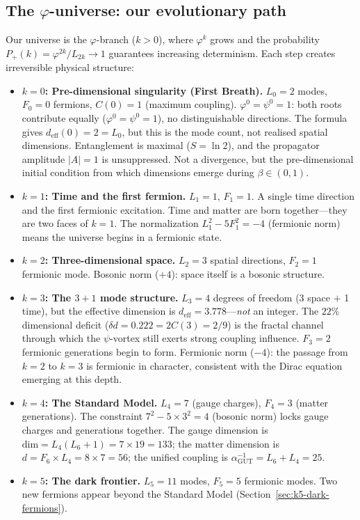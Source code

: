 \documentclass[12pt,a4paper]{article}
\begin{document}
\subsection{The $\varphi$-universe: our evolutionary path}

Our universe is the $\varphi$-branch ($k > 0$), where $\varphi^k$ grows and the probability $P_+(k) = \varphi^{2k}/L_{2k} \to 1$ guarantees increasing determinism. Each step creates irreversible physical structure:

\begin{itemize}
\item \textbf{$k = 0$: Pre-dimensional singularity (First Breath).} $L_0 = 2$ modes, $F_0 = 0$ fermions, $C(0) = 1$ (maximum coupling). $\varphi^0 = \psi^0 = 1$: both roots contribute equally ($\varphi^0 = \psi^0 = 1$), no distinguishable directions. The formula gives $d_{\mathrm{eff}}(0) = 2 = L_0$, but this is the mode count, not realised spatial dimensions. Entanglement is maximal ($S = \ln 2$), and the propagator amplitude $|A| = 1$ is unsuppressed.  Not a divergence, but the pre-dimensional initial condition from which dimensions emerge during $\beta \in (0,1)$.

\item \textbf{$k = 1$: Time and the first fermion.} $L_1 = 1$, $F_1 = 1$. A single time direction and the first fermionic excitation. Time and matter are born together---they are two faces of $k = 1$. The normalization $L_1^2 - 5F_1^2 = -4$ (fermionic norm) means the universe begins in a fermionic state.

\item \textbf{$k = 2$: Three-dimensional space.} $L_2 = 3$ spatial directions, $F_2 = 1$ fermionic mode. Bosonic norm ($+4$): space itself is a bosonic structure.

\item \textbf{$k = 3$: The $3{+}1$ mode structure.} $L_3 = 4$ degrees of freedom (3 space $+$ 1 time), but the effective dimension is $d_{\mathrm{eff}} = 3.778$---\emph{not} an integer.  The $22\%$ dimensional deficit ($\delta d = 0.222 = 2C(3) = 2/9$) is the fractal channel through which the $\psi$-vortex still exerts strong coupling influence.  $F_3 = 2$ fermionic generations begin to form. Fermionic norm ($-4$): the passage from $k = 2$ to $k = 3$ is fermionic in character, consistent with the Dirac equation emerging at this depth.

\item \textbf{$k = 4$: The Standard Model.} $L_4 = 7$ (gauge charges), $F_4 = 3$ (matter generations). The constraint $7^2 - 5 \times 3^2 = 4$ (bosonic norm) locks gauge charges and generations together. The gauge dimension is $\mathrm{dim} = L_4(L_6+1) = 7 \times 19 = 133$; the matter dimension is $d = F_6 \times L_4 = 8 \times 7 = 56$; the unified coupling is $\alpha_{\mathrm{GUT}}^{-1} = L_6 + L_4 = 25$.

\item \textbf{$k = 5$: The dark frontier.} $L_5 = 11$ modes, $F_5 = 5$ fermionic modes. Two new fermions appear beyond the Standard Model (Section~\ref{sec:k5-dark-fermions}).
\end{itemize}
\end{document}
